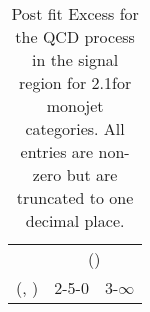 \begin{table}[h!]
\tiny
\centering
\caption{Post fit Excess for the QCD process in the signal region for 2.1\ifb for monojet categories. All entries are non-zero but are truncated to one decimal place.\label{tab:excessseppost_sig_qcd_mono}}
\begin{tabular}
{ccc}
	\hline\hline
	& \multicolumn{2}{c}{\scalht (\gev)} \\ 
	 (\njet,  \nb) & 2-5-0 & 3-$\infty$ \\ [0.8ex] 
\hline
	\hline
	\hline
\end{tabular}
\end{table}

